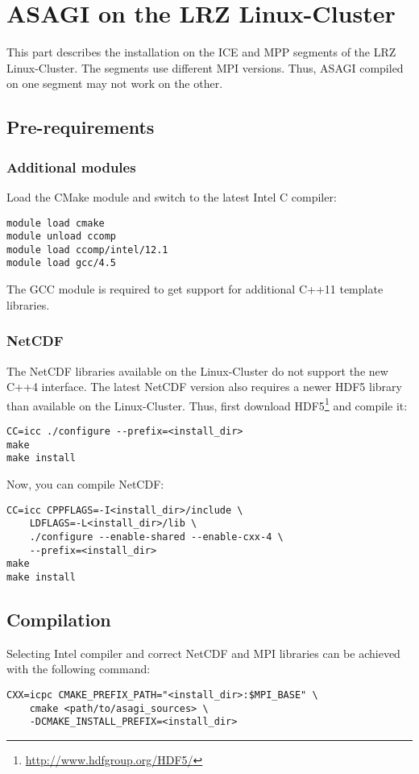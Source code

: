 \section{ASAGI on the LRZ Linux-Cluster}

This part describes the installation on the ICE and MPP segments of the LRZ Linux-Cluster. The segments use different MPI versions. Thus, ASAGI compiled on one segment may not work on the other.

\subsection{Pre-requirements}

\subsubsection{Additional modules}

Load the CMake module and switch to the latest Intel C compiler:
\lstset{language=bash}
\begin{lstlisting}
module load cmake
module unload ccomp
module load ccomp/intel/12.1
module load gcc/4.5
\end{lstlisting}

The GCC module is required to get support for additional C++11 template libraries.

\subsubsection{NetCDF}

The NetCDF libraries available on the Linux-Cluster do not support the new C++4 interface. The latest NetCDF version also requires a newer HDF5 library than available on the Linux-Cluster. Thus, first download HDF5\footnote{\url{http://www.hdfgroup.org/HDF5/}} and compile it:

\lstset{language=bash}
\begin{lstlisting}
CC=icc ./configure --prefix=<install_dir>
make
make install
\end{lstlisting}

Now, you can compile NetCDF:
\lstset{language=bash}
\begin{lstlisting}
CC=icc CPPFLAGS=-I<install_dir>/include \
    LDFLAGS=-L<install_dir>/lib \
    ./configure --enable-shared --enable-cxx-4 \
    --prefix=<install_dir>
make
make install
\end{lstlisting}

\subsection{Compilation}

Selecting Intel compiler and correct NetCDF and MPI libraries can be achieved with the following command:
\lstset{language=bash}
\begin{lstlisting}
CXX=icpc CMAKE_PREFIX_PATH="<install_dir>:$MPI_BASE" \
    cmake <path/to/asagi_sources> \
    -DCMAKE_INSTALL_PREFIX=<install_dir>
\end{lstlisting}
